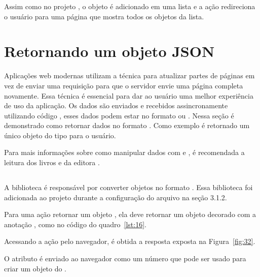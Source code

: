 
Assim como no projeto , o objeto  é adicionado em uma lista e a ação redireciona o usuário para uma página que mostra todos os objetos da lista.

\section{Retornando um objeto JSON}

Aplicações web modernas utilizam a técnica  para atualizar partes de páginas em vez de enviar uma requisição para que o servidor envie uma página completa novamente. Essa técnica é essencial para dar ao usuário uma melhor experiência de uso da aplicação. Os dados são enviados e recebidos assincronamente utilizando código , esses dados podem estar no formato  ou . Nessa seção é demonstrado como retornar dados no formato . Como exemplo é retornado um único objeto do tipo  para o usuário.

Para mais informações sobre como manipular dados com  e , é recomendada a leitura dos livros  e  da editora .

\subsection{}

A biblioteca  é responsável por converter objetos  no formato . Essa biblioteca foi adicionada ao projeto durante a configuração do arquivo  na seção 3.1.2. 

Para uma ação retornar um objeto , ela deve retornar um objeto  decorado com a anotação , como no código do quadro~\ref{lst:16}.


Acessando a ação  pelo navegador, é obtida a resposta exposta na Figura~\ref{fig:32}.


O atributo  é enviado ao navegador como um número que pode ser usado para criar um objeto  do .

